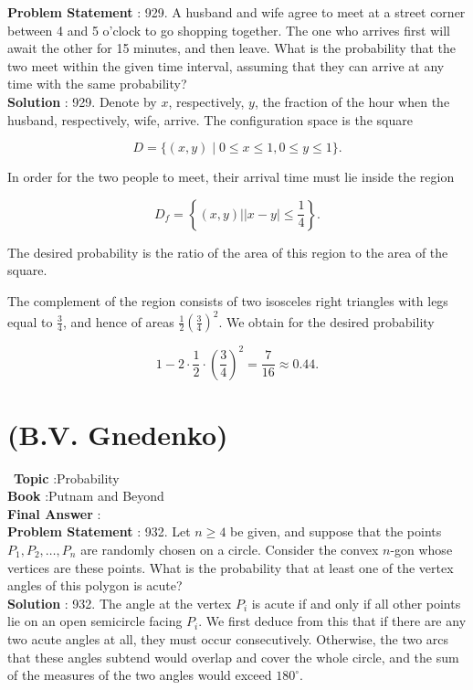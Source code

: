 \documentclass[10pt]{article}
\begin{document}
\textbf{Problem Statement} :
929. A husband and wife agree to meet at a street corner between 4 and 5 o'clock to go shopping together. The one who arrives first will await the other for 15 minutes, and then leave. What is the probability that the two meet within the given time interval, assuming that they can arrive at any time with the same probability? 
\\
\textbf{Solution} :
929. Denote by $x$, respectively, $y$, the fraction of the hour when the husband, respectively, wife, arrive. The configuration space is the square 

$$
D=\{(x, y) \mid 0 \leq x \leq 1,0 \leq y \leq 1\} .
$$

In order for the two people to meet, their arrival time must lie inside the region

$$
D_{f}=\left\{(x, y)|| x-y \mid \leq \frac{1}{4}\right\} .
$$

The desired probability is the ratio of the area of this region to the area of the square.

The complement of the region consists of two isosceles right triangles with legs equal to $\frac{3}{4}$, and hence of areas $\frac{1}{2}\left(\frac{3}{4}\right)^{2}$. We obtain for the desired probability

$$
1-2 \cdot \frac{1}{2} \cdot\left(\frac{3}{4}\right)^{2}=\frac{7}{16} \approx 0.44 .
$$

\section{(B.V. Gnedenko)}\
\textbf{Topic} :Probability\\
\textbf{Book} :Putnam and Beyond\\
\textbf{Final Answer} :\\


\textbf{Problem Statement} :
932. Let $n \geq 4$ be given, and suppose that the points $P_{1}, P_{2}, \ldots, P_{n}$ are randomly chosen on a circle. Consider the convex $n$-gon whose vertices are these points. What is the probability that at least one of the vertex angles of this polygon is acute?
\\
\textbf{Solution} :
932. The angle at the vertex $P_{i}$ is acute if and only if all other points lie on an open semicircle facing $P_{i}$. We first deduce from this that if there are any two acute angles at all, they must occur consecutively. Otherwise, the two arcs that these angles subtend would overlap and cover the whole circle, and the sum of the measures of the two angles would exceed $180^{\circ}$.
\end{document}
